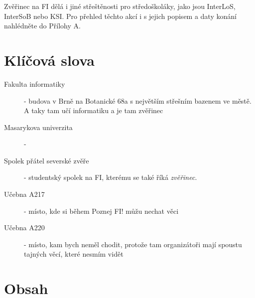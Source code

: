 \documentclass[]{article}
\begin{document}
Zvěřinec na FI dělá i jiné střeštěnosti pro středoškoláky, jako jsou InterLoS, InterSoB nebo KSI. Pro přehled těchto akcí i s jejich popisem a daty konání nahlédněte do Přílohy A.

\pagebreak
\section*{Klíčová slova}

\begin{description}
    \item[Fakulta informatiky] - budova v Brně na Botanické 68a s největším střešním bazenem ve městě. A taky tam učí informatiku a je tam zvěřinec
    \item[Masarykova univerzita] - 
    \item[Spolek přátel severské zvěře] - studentský spolek na FI, kterému se také říká \textit{zvěřinec}.
    \item[Učebna A217] - místo, kde si během Poznej FI! můžu nechat věci
    \item[Učebna A220] - místo, kam bych neměl chodit, protože tam organizátoři mají spoustu tajných věcí, které nesmím vidět
\end{description}

\pagebreak
\section*{Obsah}
\end{document}
